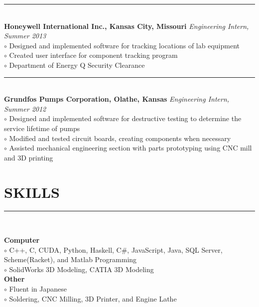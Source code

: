 \documentclass[twoside]{article}
\begin{document}
\begin{adjustwidth}{0.2in}{0in}
\rule{7.3in}{0.5pt}\\
\textbf{Honeywell International Inc., Kansas City, Missouri} \hfill \textit{Engineering Intern, Summer 2013}\\
$\circ$ Designed and implemented software for tracking locations of lab equipment\\
$\circ$ Created user interface for component tracking program\\
$\circ$ Department of Energy Q Security Clearance\\
\rule{7.3in}{0.5pt}\\
\textbf{Grundfos Pumps Corporation, Olathe, Kansas} \hfill \textit{Engineering Intern, Summer 2012}\\
$\circ$ Designed and implemented software for destructive testing to determine the service lifetime of pumps\\
$\circ$ Modified and tested circuit boards, creating components when necessary\\
$\circ$ Assisted mechanical engineering section with parts prototyping using CNC mill and 3D printing\\
\end{adjustwidth}

\section*{SKILLS}
\vspace{-1em}
\rule{\textwidth}{1pt}\\
\begin{adjustwidth}{0.2in}{0in}
\vspace{-1em}
\textbf{Computer}\\
$\circ$ C++, C, CUDA, Python, Haskell, C\#, JavaScript, Java, SQL Server, Scheme(Racket), and Matlab Programming\\
$\circ$ SolidWorks 3D Modeling, CATIA 3D Modeling\\
\textbf{Other}\\
$\circ$ Fluent in Japanese\\
$\circ$ Soldering, CNC Milling, 3D Printer, and Engine Lathe\\
\end{adjustwidth}
\end{document}
